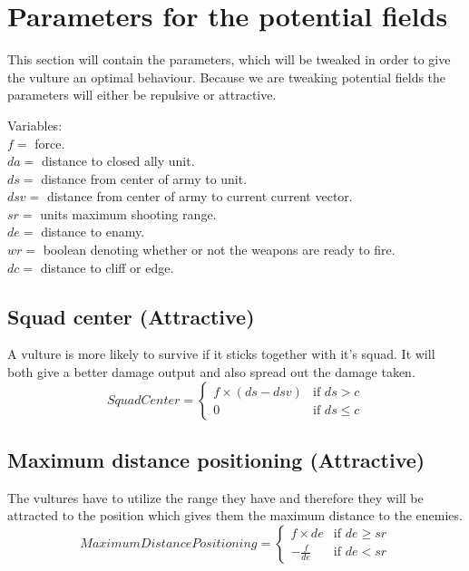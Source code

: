\section{Parameters for the potential fields}
	This section will contain the parameters, which will be tweaked in order to give the vulture an optimal behaviour. Because we are tweaking 
	potential fields the parameters will either be repulsive or attractive.
	
	Variables:\\
	$f =$ force.\\
	$da =$ distance to closed ally unit.\\
	$ds =$ distance from center of army to unit.\\
	$dsv =$ distance from center of army to current current vector.\\
	$sr =$ units maximum shooting range.\\
	$de =$ distance to enamy.\\
	$wr =$ boolean denoting whether or not the weapons are ready to fire.\\
	$dc =$ distance to cliff or edge.
	
	\subsection*{Squad center (Attractive)}
		A vulture is more likely to survive if it sticks together with it's squad. It will both give a better damage output and also spread out the 
		damage taken.
		\begin{displaymath}
			SquadCenter  = \begin{cases}
					f \times (ds - dsv) & \text{if } ds > c\\
					0 & \text{if } ds \leq c
				\end{cases}		
		\end{displaymath}
		
		
	\subsection*{Maximum distance positioning (Attractive)}
		The vultures have to utilize the range they have and therefore they will be attracted to the position which gives them the maximum distance 
		to the enemies.
		\begin{displaymath}
			MaximumDistancePositioning = \begin{cases}
					f \times de & \text{if } de \geq sr\\
					- \frac{f}{de} & \text{if } de < sr
				\end{cases}		
		\end{displaymath}
